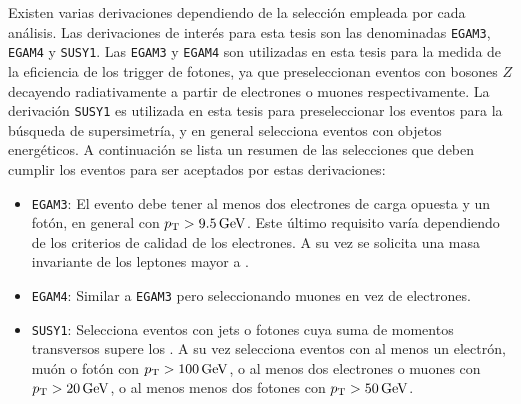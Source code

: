 Existen varias derivaciones dependiendo de la selección empleada por cada análisis. Las derivaciones de interés para esta tesis son las denominadas \texttt{EGAM3}, \texttt{EGAM4} y \texttt{SUSY1}. Las \texttt{EGAM3} y \texttt{EGAM4} son utilizadas en esta tesis para la medida de la eficiencia de los trigger de fotones, ya que preseleccionan eventos con bosones $Z$ decayendo radiativamente a partir de electrones o muones respectivamente. La derivación \texttt{SUSY1} es utilizada en esta tesis para preseleccionar los eventos para la búsqueda de supersimetría, y en general selecciona eventos con objetos energéticos. A continuación se lista un resumen de las selecciones que deben cumplir los eventos para ser aceptados por estas derivaciones:


\begin{itemize}
  \item \texttt{EGAM3}: El evento debe tener al menos dos electrones de carga opuesta y un fotón, en general con $p_{\text{T}}>9.5\,\text{GeV}$. Este último requisito varía dependiendo de los criterios de calidad de los electrones. A su vez se solicita una masa invariante de los leptones mayor a .
  \item \texttt{EGAM4}: Similar a \texttt{EGAM3} pero seleccionando muones en vez de electrones.
  \item \texttt{SUSY1}: Selecciona eventos con jets o fotones cuya suma de momentos transversos supere los . A su vez selecciona eventos con al menos un electrón, muón o fotón con $p_{\text{T}}>100\,\text{GeV}$, o al menos dos electrones o muones con $p_{\text{T}}>20\,\text{GeV}$, o al menos menos dos fotones con $p_{\text{T}}>50\,\text{GeV}$.
\end{itemize}




